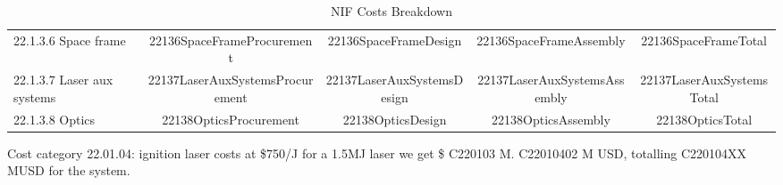 \begin{table}[h!]
{\begin{tabular}{lcccc}
\hspace{5mm}22.1.3.6 Space frame & 22136SpaceFrameProcurement & 22136SpaceFrameDesign & 22136SpaceFrameAssembly & 22136SpaceFrameTotal \\
\hspace{5mm}22.1.3.7 Laser aux systems & 22137LaserAuxSystemsProcurement & 22137LaserAuxSystemsDesign & 22137LaserAuxSystemsAssembly & 22137LaserAuxSystemsTotal \\
\hspace{5mm}22.1.3.8 Optics & 22138OpticsProcurement & 22138OpticsDesign & 22138OpticsAssembly & 22138OpticsTotal \\
\hline
\end{tabular}}
\caption{NIF Costs Breakdown}
\label{tab:nif_costs}
\end{table}



Cost category 22.01.04: ignition laser costs at  \$750/J for a 1.5MJ laser we get \$ C220103 M. C22010402 M USD, totalling C220104XX MUSD for the system.



